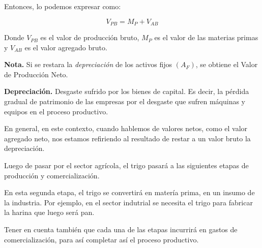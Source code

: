 Entonces, lo podemos expresar como:

\begin{equation*}
    V_{PB} = M_P + V_{AB}
\end{equation*}

Donde \(V_{PB}\) es el valor de producción bruto,
\(M_P\) es el valor de las materias primas y
\(V_{AB}\) es el valor agregado bruto.

\textbf{Nota.}
Si se restara la \textit{depreciación}
de los activos fijos \((A_F)\),
se obtiene el Valor de Producción Neto.

\textbf{Depreciación.}
Desgaste sufrido por los bienes de capital.
Es decir,
la pérdida gradual de patrimonio de las empresas 
por el desgaste que sufren máquinas y equipos en el proceso productivo.

En general,
en este contexto,
cuando hablemos de valores netos,
como el valor agregado neto,
nos estamos refiriendo al resultado de restar a un valor bruto la depreciación.

Luego de pasar por el sector agrícola,
el trigo pasará a las siguientes etapas  de producción y comercialización.

En esta segunda etapa,
el trigo se convertirá en matería prima,
en un insumo de la industria.
Por ejemplo, en el sector indutrial se necesita el trigo para fabricar la
harina que luego será pan.

Tener en cuenta también que cada una de las etapas incurrirá en gastos de
comercialización, para así completar así el proceso productivo.

